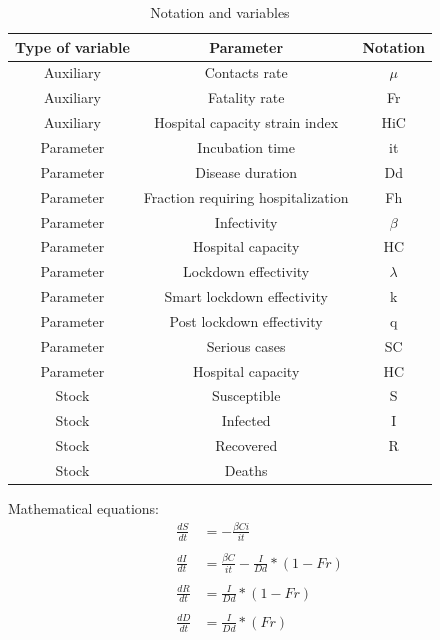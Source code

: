 \documentclass[12pt,a4paper,english]{article}
\begin{document}
    \begin{table}[h!]
        \begin{center}
            \begin{tabular}{|c|c|c|}
                \hline
                Type of variable & Parameter & Notation \\
                \hline
                Auxiliary & Contacts rate                      & $\mu$  \\
                Auxiliary & Fatality rate                      & Fr \\
                Auxiliary & Hospital capacity strain index     & HiC \\
                Parameter & Incubation time                    & it \\
                Parameter & Disease duration                   & Dd \\
                Parameter & Fraction requiring hospitalization & Fh \\
                Parameter & Infectivity                        & $\beta$ \\
                Parameter & Hospital capacity                  & HC \\
                Parameter & Lockdown effectivity               & $\lambda$ \\
                Parameter & Smart lockdown effectivity         & k \\
                Parameter & Post lockdown effectivity          & q \\
                Parameter & Serious cases                      & SC  \\
                Parameter & Hospital capacity                  & HC \\
                Stock     & Susceptible                        & S \\
                Stock     & Infected                           & I \\
                Stock     & Recovered                          & R \\
                Stock     & Deaths                             &  \\
                \hline
            \end{tabular}
        \end{center}
        \caption{Notation and variables \cite{math_article}}
        \label{tab:not_var}
    \end{table}

    Mathematical equations:
        \begin{align*}
            \frac{dS}{dt} &= - \frac{\beta Ci}{it}\\ \\
            \frac{dI}{dt} &= \frac{\beta C}{it} - \frac{I}{Dd} * (1 - Fr)\\ \\
            \frac{dR}{dt} &= \frac{I}{Dd} * (1 - Fr)\\ \\
            \frac{dD}{dt} &= \frac{I}{Dd} * (Fr)
        \end{align*}
        
\end{document}
